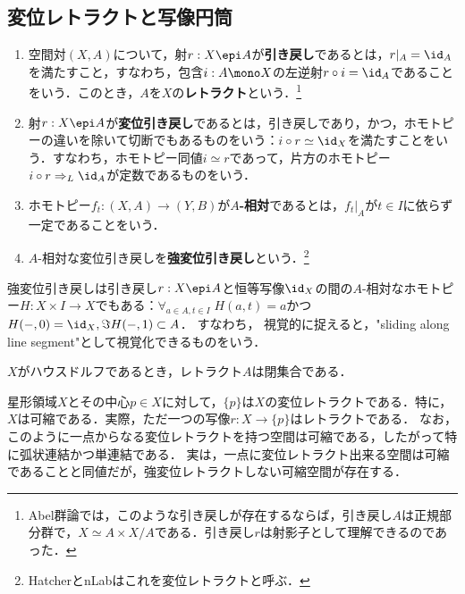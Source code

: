 \documentclass[uplatex, dvipdfmx]{jsreport}
\begin{document}
\subsection{変位レトラクトと写像円筒}

\begin{definition}\mbox{}
    \begin{enumerate}
        \item 空間対$(X,A)$について，射$r:X\epi A$が\textbf{引き戻し}であるとは，$r|_A=\id_A$を満たすこと，すなわち，包含$i:A\mono X$の左逆射$r\circ i=\id_A$であることをいう．このとき，$A$を$X$の\textbf{レトラクト}という．\footnote{Abel群論では，このような引き戻しが存在するならば，引き戻し$A$は正規部分群で，$X\simeq A\times X/A$である．引き戻し$r$は射影子として理解できるのであった．}
        \item 射$r:X\epi A$が\textbf{変位引き戻し}であるとは，引き戻しであり，かつ，ホモトピーの違いを除いて切断でもあるものをいう：$i\circ r\simeq\id_X$を満たすことをいう．すなわち，ホモトピー同値$i\simeq r$であって，片方のホモトピー$i\circ r\Rightarrow_L\id_A$が定数であるものをいう．
        \item ホモトピー$f_t:(X,A)\to(Y,B)$が\textbf{$A$-相対}であるとは，$f_t|_A$が$t\in I$に依らず一定であることをいう．
        \item $A$-相対な変位引き戻しを\textbf{強変位引き戻し}という．\footnote{HatcherとnLabはこれを変位レトラクトと呼ぶ．}
    \end{enumerate}
\end{definition}
\begin{remarks}
    強変位引き戻しは引き戻し$r:X\epi A$と恒等写像$\id_X$の間の$A$-相対なホモトピー$H:X\times I\to X$でもある：$\forall_{a\in A,t\in I}\;H(a,t)=a$かつ$H(-,0)=\id_X,\Im H(-,1)\subset A$．
    すなわち，
    視覚的に捉えると，"sliding along line segment"として視覚化できるものをいう．
\end{remarks}

\begin{lemma}
    $X$がハウスドルフであるとき，レトラクト$A$は閉集合である．
\end{lemma}

\begin{example}[星型領域の変位レトラクト]
    星形領域$X$とその中心$p\in X$に対して，$\{p\}$は$X$の変位レトラクトである．特に，$X$は可縮である．実際，ただ一つの写像$r:X\to\{p\}$はレトラクトである．
    なお，このように一点からなる変位レトラクトを持つ空間は可縮である，したがって特に弧状連結かつ単連結である．
    実は，一点に変位レトラクト出来る空間は可縮であることと同値だが，強変位レトラクトしない可縮空間が存在する．
\end{example}
\end{document}
